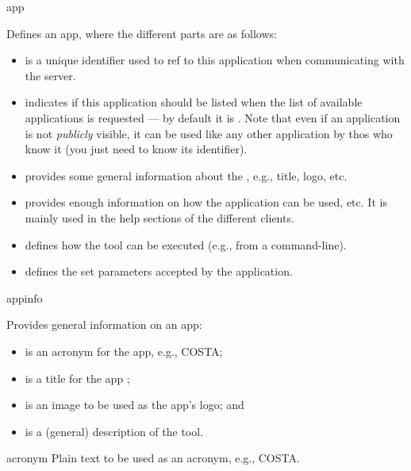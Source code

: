 \bigskip
\xmlstruct
{app}
{
%
  Defines an app, where the different parts are as follows:
%
  \begin{itemize}

  \item {} is a unique identifier used to ref to this
    application when communicating with the server.

  \item {} indicates if this application should be listed
    when the list of available applications is requested --- by
    default it is . Note that even if an
    application is not \emph{publicly} visible, it can be used like
    any other application by thos who know it  (you just need
    to know its identifier).

  \item {} provides some general information about
    the \app, e.g., title, logo, etc.

  \item {} provides enough information on how the
    application can be used, etc. It is mainly used in the help
    sections of the different clients.

  \item {} defines how the tool can be executed
    (e.g., from a command-line). 

  \item {} defines the set parameters accepted
    by the application.

  \end{itemize}
%
}
{}%


\bigskip
\xmlstruct
{appinfo}
{
%
  Provides general information on an app:

  \begin{itemize}
  \item {} is an acronym for the app,
    e.g., COSTA;
  \item {} is a title for the app ;
  \item {} is an image to be used as the
    app's logo; and
  \item {} is a (general) description of the tool.
  \end{itemize}
%
}
{}


\bigskip
\xmlstruct
{acronym}
{
%
  Plain text to be used as an acronym, e.g., COSTA.
%
}
{}


